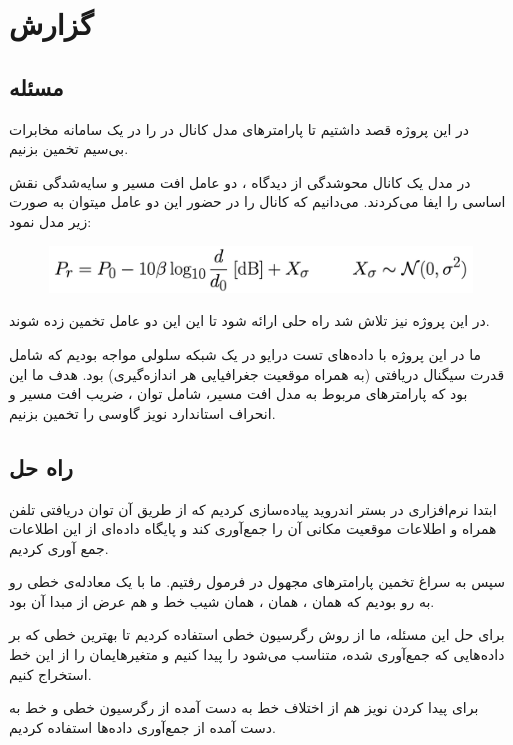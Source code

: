 \chapter{گزارش}

\section{مسئله}
	
در این پروژه قصد داشتیم تا پارامترهای مدل کانال در
 را در یک سامانه مخابرات بی‌سیم تخمین بزنیم. 

در مدل یک کانال محوشدگی از دیدگاه 
، 
دو عامل افت مسیر و سایه‌شدگی نقش اساسی را ایفا می‌کردند. می‌دانیم که کانال را در حضور این دو عامل میتوان به صورت زیر مدل نمود:
\begin{figure}[H]
	\includegraphics[width=0.75\columnwidth]{Picture/formula.png}
	\centering
\end{figure}
در این پروژه نیز تلاش شد راه حلی ارائه شود تا این این دو عامل تخمین زده شوند.

ما در این پروژه با داده‌های تست درایو در یک شبکه سلولی مواجه بودیم که شامل قدرت سیگنال دریافتی (به همراه موقعیت جغرافیایی هر اندازه‌گیری) بود. هدف ما این بود که پارامترهای مربوط به مدل افت مسیر، شامل توان
، 
ضریب افت مسیر 
\lr{(\lr{$\beta$})}
و انحراف استاندارد نویز گاوسی 
\lr{(\lr{$\sigma$})}
 را تخمین بزنیم.
	
\section{راه حل}

ابتدا نرم‌افزاری در بستر اندروید پیاده‌سازی کردیم که از طریق آن توان دریافتی تلفن همراه و اطلاعات موقعیت مکانی آن را جمع‌آوری کند و پایگاه داده‌ای از این اطلاعات جمع آوری کردیم.

سپس به سراغ تخمین پارامترهای مجهول در فرمول رفتیم. ما با یک معادله‌ی خطی رو به رو بودیم که 
همان 
،
همان
،
\lr{$\beta$}
همان شیب خط و 
هم عرض از مبدا آن بود.

برای حل این مسئله، ما از روش رگرسیون خطی استفاده کردیم تا بهترین خطی که بر داده‌هایی که جمع‌آوری شده، متناسب می‌شود را پیدا کنیم و متغیرهایمان را از این خط استخراج کنیم.

برای پیدا کردن 
\lr{$\sigma$}
نویز هم از اختلاف خط به دست آمده از رگرسیون خطی و خط به دست آمده از جمع‌آوری داده‌ها استفاده کردیم.

